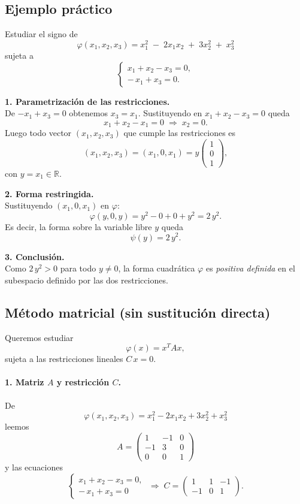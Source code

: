 \documentclass{article}
\begin{document}
\subsection*{Ejemplo práctico}

Estudiar el signo de
\[
\varphi(x_1,x_2,x_3)
= x_1^2 \;-\; 2x_1x_2 \;+\; 3x_2^2 \;+\; x_3^2
\]
sujeta a
\[
\begin{cases}
x_1 + x_2 - x_3 = 0,\\
-\,x_1 + x_3 = 0.
\end{cases}
\]

\medskip

\noindent\textbf{1. Parametrización de las restricciones.}\\
De \(-x_1 + x_3 = 0\) obtenemos \(x_3 = x_1\). Sustituyendo en
\(x_1 + x_2 - x_3 = 0\) queda
\[
x_1 + x_2 - x_1 = 0
\;\Longrightarrow\;
x_2 = 0.
\]
Luego todo vector \((x_1,x_2,x_3)\) que cumple las restricciones es
\[
(x_1,x_2,x_3) = (x_1,0,x_1) = y\begin{pmatrix}1\\0\\1\end{pmatrix},
\]
con \(y = x_1\in\mathbb{R}\).

\medskip

\noindent\textbf{2. Forma restringida.}\\
Sustituyendo \((x_1,0,x_1)\) en \(\varphi\):
\[
\varphi(y,0,y)
= y^2 - 0 + 0 + y^2
= 2\,y^2.
\]
Es decir, la forma sobre la variable libre \(y\) queda
\[
\psi(y) = 2\,y^2.
\]

\medskip

\noindent\textbf{3. Conclusión.}\\
Como \(2\,y^2>0\) para todo \(y\neq0\), la forma cuadrática
\(\varphi\) es \emph{positiva definida} en el subespacio
definido por las dos restricciones.


\subsection*{Método matricial (sin sustitución directa)}

Queremos estudiar
\[
\varphi(x) = x^T A x,
\]
sujeta a las restricciones lineales \(C\,x=0\). 

\paragraph*{1. Matriz \(A\) y restricción \(C\).}  
De
\[
\varphi(x_1,x_2,x_3)
= x_1^2 - 2x_1x_2 + 3x_2^2 + x_3^2
\]
leemos
\[
A = \begin{pmatrix}
1 & -1 & 0\\[4pt]
-1 &  3 & 0\\[4pt]
 0 &  0 & 1
\end{pmatrix}
\]
y las ecuaciones
\[
\begin{cases}
x_1 + x_2 - x_3 = 0,\\
-\,x_1 + x_3 = 0
\end{cases}
\;\Longrightarrow\;
C = \begin{pmatrix}
1 & 1 & -1\\[4pt]
-1 & 0 &  1
\end{pmatrix}.
\]
\end{document}
